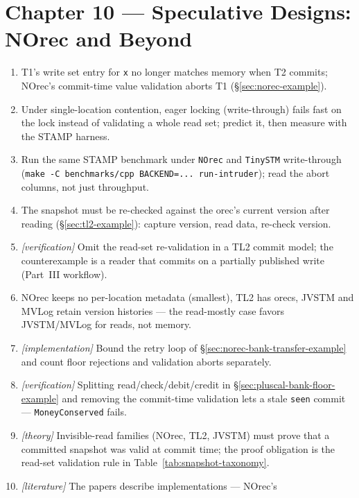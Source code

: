 \section*{Chapter 10 --- Speculative Designs: NOrec and Beyond}

\begin{enumerate}
    \item T1's write set entry for \texttt{x} no longer matches memory when
          T2 commits; NOrec's commit-time value validation aborts T1
          (\S\ref{sec:norec-example}).
    \item Under single-location contention, eager locking (write-through)
          fails fast on the lock instead of validating a whole read set;
          predict it, then measure with the STAMP harness.
    \item Run the same STAMP benchmark under \texttt{NOrec} and
          \texttt{TinySTM} write-through
          (\texttt{make -C benchmarks/cpp BACKEND=... run-intruder}); read
          the abort columns, not just throughput.
    \item The snapshot must be re-checked against the orec's current
          version after reading (\S\ref{sec:tl2-example}): capture version,
          read data, re-check version.
    \item \emph{[verification]} Omit the read-set re-validation in a TL2
          commit model; the counterexample is a reader that commits on a
          partially published write (Part~III workflow).
    \item NOrec keeps no per-location metadata (smallest), TL2 has orecs,
          JVSTM and MVLog retain version histories --- the read-mostly
          case favors JVSTM/MVLog for reads, not memory.
    \item \emph{[implementation]} Bound the retry loop of
          \S\ref{sec:norec-bank-transfer-example} and count floor rejections
          and validation aborts separately.
    \item \emph{[verification]} Splitting read/check/debit/credit in
          \S\ref{sec:pluscal-bank-floor-example} and removing the
          commit-time validation lets a stale \texttt{seen} commit ---
          \texttt{MoneyConserved} fails.
    \item \emph{[theory]} Invisible-read families (NOrec, TL2, JVSTM) must
          prove that a committed snapshot was valid at commit time; the
          proof obligation is the read-set validation rule in
          Table~\ref{tab:snapshot-taxonomy}.
    \item \emph{[literature]} The papers describe implementations --- NOrec's

\end{enumerate}
